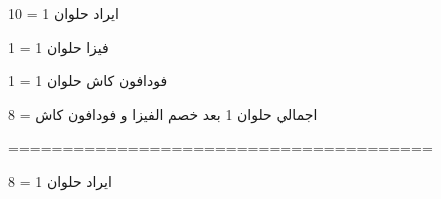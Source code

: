 
 ايراد حلوان 1 = 10

 فيزا حلوان 1 = 1

 فودافون كاش حلوان 1 = 1

 اجمالي حلوان 1 بعد خصم الفيزا و فودافون كاش = 8

=======================================

 ايراد حلوان 1 = 8